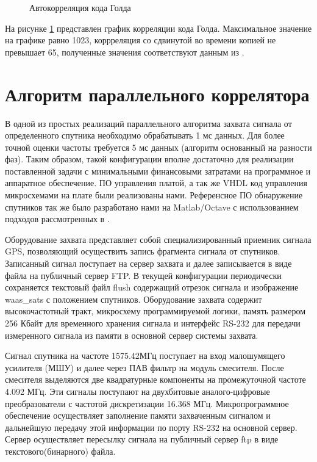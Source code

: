 \documentclass[a4paper,12pt]{article}
\numberwithin{table}{section}
\begin{document}
\begin{figure}[h]
\begin{center}
\end{center}
\caption{Автокорреляция кода Голда}
\label{pic:gold}
\end{figure}
На рисунке \ref{pic:gold} представлен график корреляции кода Голда. Максимальное значение на графике равно 1023, коррреляция 
со сдвинутой во времени копией не превышает 65, полученные значения соответствуют данным из \cite{gold-ieee}.

\section{Алгоритм параллельного коррелятора}

В одной из простых реализаций параллельного алгоритма захвата сигнала от определенного спутника необходимо обрабатывать 1 мс данных.
Для более точной оценки частоты требуется 5 мс данных (алгоритм основанный на разности фаз).
Таким образом, такой конфигурации вполне достаточно для реализации поставленной задачи с минимальными
финансовыми затратами на программное и аппаратное обеспечение.
ПО управления платой, а так же VHDL код управления микросхемами на плате были реализованы нами.
Референсное ПО обнаружение спутников так же было разработано нами на Matlab/Octave с использованием подходов рассмотренных в \cite{tsui}.

Оборудование захвата представляет собой специализированный приемник сигнала GPS, позволяющий осуществить запись фрагмента сигнала от спутников.
Записанный сигнал поступает на сервер захвата и далее записывается в виде файла на публичный сервер FTP.
В текущей конфигурации \cite{gpsproject} периодически сохраняется текстовый файл flush содержащий отрезок сигнала и изображение waas\_sats с
положением спутников. Оборудование захвата содержит высокочастотный тракт, микросхему программируемой логики, память размером 256 Кбайт
для временного хранения сигнала и интерфейс RS-232 для передачи измеренного сигнала из памяти в основной сервер системы захвата.

Сигнал спутника на частоте 1575.42МГц поступает на вход малошумящего усилителя (МШУ) и далее через ПАВ фильтр на модуль смесителя.
После смесителя выделяются две квадратурные компоненты на промежуточной частоте 4.092 МГц.
Эти сигналы поступают на двухбитовые аналого-цифровые преобразователи с частотой дискретизации 16.368 МГц.
Микропрограммное обеспечение осуществляет заполнение памяти захваченным сигналом и дальнейшую передачу этой информации
по порту RS-232 на основной сервер. Сервер осуществляет пересылку сигнала на публичный сервер ftp в виде текстового(бинарного) файла.
\end{document}
